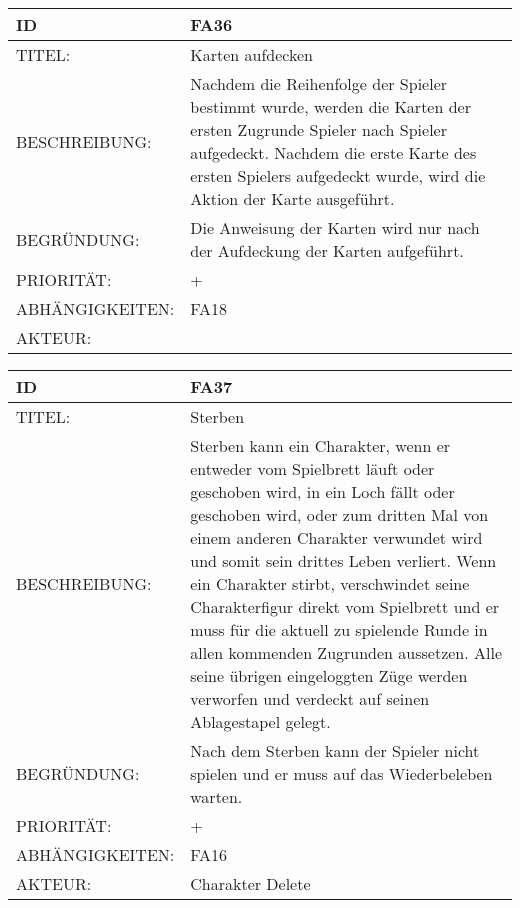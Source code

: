 \documentclass{uulm-assignment}
\begin{document}
    \begin{tabularx}{\textwidth}{|l|X |} \hline
        \textbf{ID} & \textbf{FA36} \\
        \hline
        TITEL: & Karten aufdecken\\
        \hline
        BESCHREIBUNG: & Nachdem die Reihenfolge der Spieler bestimmt wurde, werden die Karten der ersten Zugrunde Spieler
nach Spieler aufgedeckt. Nachdem die erste Karte des ersten Spielers aufgedeckt wurde, wird die
Aktion der Karte ausgeführt. 
        \\
        \hline
        BEGRÜNDUNG: & Die Anweisung der Karten wird nur nach der Aufdeckung der Karten aufgeführt.\\
        \hline
        PRIORITÄT: & +\\
        \hline
        ABHÄNGIGKEITEN: & FA18\\
        \hline
        AKTEUR: & \\
        \hline
    \end{tabularx}
    
    \begin{tabularx}{\textwidth}{|l|X |} \hline
        \textbf{ID} & \textbf{FA37} \\
        \hline
        TITEL: & Sterben\\
        \hline
        BESCHREIBUNG: &
Sterben kann ein Charakter, wenn er entweder vom Spielbrett läuft oder geschoben wird, in ein Loch
fällt oder geschoben wird, oder zum dritten Mal von einem anderen Charakter verwundet wird und
somit sein drittes Leben verliert. \newline
Wenn ein Charakter stirbt, verschwindet seine Charakterfigur direkt vom Spielbrett und er muss
für die aktuell zu spielende Runde in allen kommenden Zugrunden aussetzen. Alle seine übrigen
eingeloggten Züge werden verworfen und verdeckt auf seinen Ablagestapel gelegt.
        \\
        \hline
        BEGRÜNDUNG: & Nach dem Sterben kann der Spieler nicht spielen und er muss auf das Wiederbeleben warten.\\
        \hline
        PRIORITÄT: & +\\
        \hline
        ABHÄNGIGKEITEN: & FA16\\
        \hline
        AKTEUR: & Charakter Delete \\
        \hline
    \end{tabularx}
    
\end{document}
